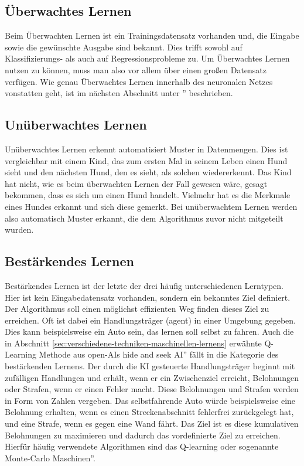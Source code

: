 \documentclass[11pt]{article}
\begin{document}
\subsection{Überwachtes Lernen}
Beim Überwachten Lernen ist ein Trainingsdatensatz vorhanden und, die Eingabe sowie die gewünschte Ausgabe sind bekannt. Dies trifft sowohl auf Klassifizierungs- als auch auf Regressionsprobleme zu. Um Überwachtes Lernen nutzen zu können, muss man also vor allem über einen großen Datensatz verfügen. Wie genau Überwachtes Lernen innerhalb des neuronalen Netzes vonstatten geht, ist im nächsten Abschnitt unter \glqq{}'' beschrieben.
\subsection{Unüberwachtes Lernen}
Unüberwachtes Lernen erkennt automatisiert Muster in Datenmengen. Dies ist vergleichbar mit einem Kind, das zum ersten Mal in seinem Leben einen Hund sieht und den nächsten Hund, den es sieht, als solchen wiedererkennt. Das Kind hat nicht, wie es beim überwachten Lernen der Fall gewesen wäre, gesagt bekommen, dass es sich um einen Hund handelt. Vielmehr hat es die Merkmale eines Hundes erkannt und sich diese gemerkt.
Bei unüberwachtem Lernen werden also automatisch Muster erkannt, die dem Algorithmus zuvor nicht mitgeteilt wurden. 
\subsection{Bestärkendes Lernen}
Bestärkendes Lernen ist der letzte der drei häufig unterschiedenen Lerntypen. Hier ist kein Eingabedatensatz vorhanden, sondern ein bekanntes Ziel definiert. Der Algorithmus soll einen möglichst effizienten Weg finden dieses Ziel zu erreichen. Oft ist dabei ein Handlungsträger (agent) in einer Umgebung gegeben. Dies kann beispielsweise ein Auto sein, das lernen soll selbst zu fahren. Auch die in Abschnitt  \ref{sec:verschiedene-techniken-maschinellen-lernens} erwähnte Q-Learning Methode aus open-AIs \glqq hide and seek AI'' fällt in die Kategorie des bestärkenden Lernens. Der durch die KI gesteuerte Handlungsträger beginnt mit zufälligen Handlungen und erhält, wenn er ein Zwischenziel erreicht, Belohnungen oder Strafen, wenn er einen Fehler macht. Diese Belohnungen und Strafen werden in Form von Zahlen vergeben. Das selbstfahrende Auto würde beispielsweise eine Belohnung erhalten, wenn es einen Streckenabschnitt fehlerfrei zurückgelegt hat, und eine Strafe, wenn es gegen eine Wand fährt. Das Ziel ist es diese kumulativen Belohnungen zu maximieren und dadurch das vordefinierte Ziel zu erreichen. Hierfür häufig verwendete Algorithmen sind das Q-learning oder sogenannte \glqq Monte-Carlo Maschinen''.
\end{document}
